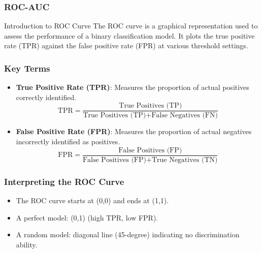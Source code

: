 \documentclass[aspectratio=169]{beamer}
\begin{document}
\begin{frame}[fragile]
    \frametitle{ROC-AUC}
    \begin{block}{Introduction to ROC Curve}
        The ROC curve is a graphical representation used to assess the performance of a binary classification model.
        It plots the true positive rate (TPR) against the false positive rate (FPR) at various threshold settings.
    \end{block}
\end{frame}

\begin{frame}[fragile]
    \frametitle{Key Terms}
    \begin{itemize}
        \item \textbf{True Positive Rate (TPR)}: Measures the proportion of actual positives correctly identified.
        \begin{equation}
        \text{TPR} = \frac{\text{True Positives (TP)}}{\text{True Positives (TP)} + \text{False Negatives (FN)}}
        \end{equation}
        
        \item \textbf{False Positive Rate (FPR)}: Measures the proportion of actual negatives incorrectly identified as positives.
        \begin{equation}
        \text{FPR} = \frac{\text{False Positives (FP)}}{\text{False Positives (FP)} + \text{True Negatives (TN)}}
        \end{equation}
    \end{itemize}
\end{frame}

\begin{frame}[fragile]
    \frametitle{Interpreting the ROC Curve}
    \begin{itemize}
        \item The ROC curve starts at (0,0) and ends at (1,1).
        \item A perfect model: (0,1) (high TPR, low FPR).
        \item A random model: diagonal line (45-degree) indicating no discrimination ability.
    \end{itemize}
\end{frame}
\end{document}
